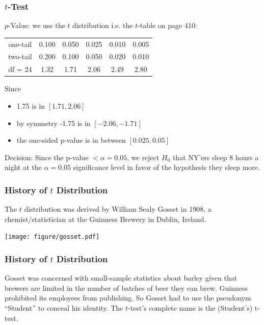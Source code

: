 \documentclass[handout]{beamer}
\newcommand{\blue}[1]{\textcolor{blue2}{#1}}
\begin{document}
\begin{frame}
\frametitle{$t$-Test}

$p$-Value: we use the $t$ distribution i.e. the $t$-table on page 410:
\begin{center}
\begin{tabular}{c|ccccc}
\hline
one-tail & 0.100 & 0.050 & 0.025 & 0.010 & 0.005\\
two-tail & 0.200 & 0.100 & 0.050 & 0.020 & 0.010\\
\hline
df = 24 & 1.32 & 1.71 & 2.06 & 2.49 & 2.80\\
\hline
\end{tabular}
\end{center}

\pause Since 
\begin{itemize}
\pause \item 1.75 is in $[1.71, 2.06]$
\pause \item by symmetry -1.75 is in $[-2.06, -1.71]$
\pause \item the one-sided p-value is in between $[0.025, 0.05]$
\end{itemize}
\vspace{0.5cm}

\pause Decision: Since the p-value $< \alpha=0.05$, we reject $H_0$ that NY'ers sleep 8 hours a night at the $\alpha=0.05$ significance level in favor of the hypothesis they sleep more.
\end{frame}


\begin{frame}
\frametitle{History of $t$ Distribution}
The $t$ distribution was derived by William Sealy Gosset in 1908, a chemist/statistician at the Guinness Brewery in Dublin, Ireland.
\begin{center}
\texttt{[image: figure/gosset.pdf]}
\end{center}
\end{frame}


\begin{frame}
\frametitle{History of $t$ Distribution}
Gosset was concerned with \blue{small-sample statistics} about barley given that brewers are limited in the number of batches of beer they can brew.
\pause \vskip 0.5cm
Guinness prohibited its employees from publishing.  So Gosset had to use the pseudonym ``Student'' to conceal his identity.
\pause \vskip 0.5cm
The $t$-test's complete name is the \blue{(Student's) t-test}.  
\end{frame}
\end{document}
